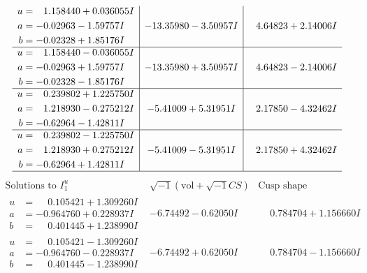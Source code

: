\documentclass[1p]{elsarticle_modified}
\theoremstyle{definition}
\newcommand{\I}{\sqrt{-1}}
\begin{document}
$$\begin{array}{c|c|c}
\begin{aligned}
u &= \phantom{-}1.158440 + 0.036055 I \\
a &= -0.02963 - 1.59757 I \\
b &= -0.02328 + 1.85176 I\end{aligned}
 & -13.35980 - 3.50957 I & \phantom{-}4.64823 + 2.14006 I \\ \hline\begin{aligned}
u &= \phantom{-}1.158440 - 0.036055 I \\
a &= -0.02963 + 1.59757 I \\
b &= -0.02328 - 1.85176 I\end{aligned}
 & -13.35980 + 3.50957 I & \phantom{-}4.64823 - 2.14006 I \\ \hline\begin{aligned}
u &= \phantom{-}0.239802 + 1.225750 I \\
a &= \phantom{-}1.218930 - 0.275212 I \\
b &= -0.62964 - 1.42811 I\end{aligned}
 & -5.41009 + 5.31951 I & \phantom{-}2.17850 - 4.32462 I \\ \hline\begin{aligned}
u &= \phantom{-}0.239802 - 1.225750 I \\
a &= \phantom{-}1.218930 + 0.275212 I \\
b &= -0.62964 + 1.42811 I\end{aligned}
 & -5.41009 - 5.31951 I & \phantom{-}2.17850 + 4.32462 I\\
 \hline 
 \end{array}$$\newpage$$\begin{array}{c|c|c}  
\text{Solutions to }I^u_{1}& \I (\text{vol} + \sqrt{-1}CS) & \text{Cusp shape}\\
 \hline 
\begin{aligned}
u &= \phantom{-}0.105421 + 1.309260 I \\
a &= -0.964760 + 0.228937 I \\
b &= \phantom{-}0.401445 + 1.238990 I\end{aligned}
 & -6.74492 - 0.62050 I & \phantom{-}0.784704 + 1.156660 I \\ \hline\begin{aligned}
u &= \phantom{-}0.105421 - 1.309260 I \\
a &= -0.964760 - 0.228937 I \\
b &= \phantom{-}0.401445 - 1.238990 I\end{aligned}
 & -6.74492 + 0.62050 I & \phantom{-}0.784704 - 1.156660 I \\ \hline\begin{aligned}

\end{aligned}
\end{array}$$
\end{document}
